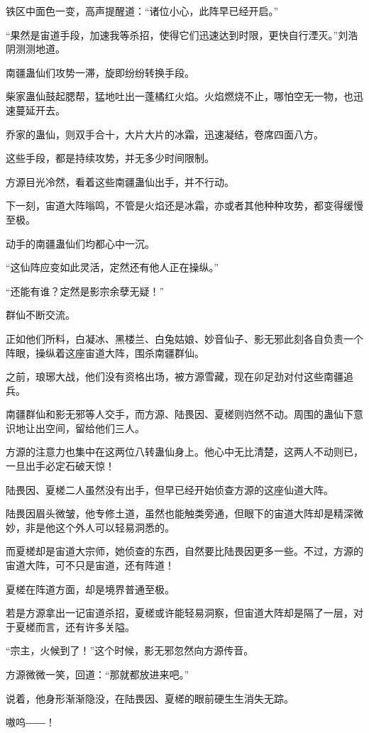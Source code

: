 \begin{this_body}
铁区中面色一变，高声提醒道：“诸位小心，此阵早已经开启。”

“果然是宙道手段，加速我等杀招，使得它们迅速达到时限，更快自行湮灭。”刘浩阴测测地道。

南疆蛊仙们攻势一滞，旋即纷纷转换手段。

柴家蛊仙鼓起腮帮，猛地吐出一蓬橘红火焰。火焰燃烧不止，哪怕空无一物，也迅速蔓延开去。

乔家的蛊仙，则双手合十，大片大片的冰霜，迅速凝结，卷席四面八方。

这些手段，都是持续攻势，并无多少时间限制。

方源目光冷然，看着这些南疆蛊仙出手，并不行动。

下一刻，宙道大阵嗡鸣，不管是火焰还是冰霜，亦或者其他种种攻势，都变得缓慢至极。

动手的南疆蛊仙们均都心中一沉。

“这仙阵应变如此灵活，定然还有他人正在操纵。”

“还能有谁？定然是影宗余孽无疑！”

群仙不断交流。

正如他们所料，白凝冰、黑楼兰、白兔姑娘、妙音仙子、影无邪此刻各自负责一个阵眼，操纵着这座宙道大阵，围杀南疆群仙。

之前，琅琊大战，他们没有资格出场，被方源雪藏，现在卯足劲对付这些南疆追兵。

南疆群仙和影无邪等人交手，而方源、陆畏因、夏槎则岿然不动。周围的蛊仙下意识地让出空间，留给他们三人。

方源的注意力也集中在这两位八转蛊仙身上。他心中无比清楚，这两人不动则已，一旦出手必定石破天惊！

陆畏因、夏槎二人虽然没有出手，但早已经开始侦查方源的这座仙道大阵。

陆畏因眉头微皱，他专修土道，虽然也能触类旁通，但眼下的宙道大阵却是精深微妙，非是他这个外人可以轻易洞悉的。

而夏槎却是宙道大宗师，她侦查的东西，自然要比陆畏因更多一些。不过，方源的宙道大阵，可不只是宙道，还有阵道！

夏槎在阵道方面，却是境界普通至极。

若是方源拿出一记宙道杀招，夏槎或许能轻易洞察，但宙道大阵却是隔了一层，对于夏槎而言，还有许多关隘。

“宗主，火候到了！”这个时候，影无邪忽然向方源传音。

方源微微一笑，回道：“那就都放进来吧。”

说着，他身形渐渐隐没，在陆畏因、夏槎的眼前硬生生消失无踪。

嗷呜――！


\end{this_body}
